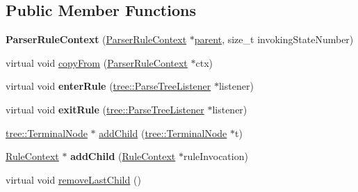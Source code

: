 \subsection*{Public Member Functions}
\begin{DoxyCompactItemize}
\item 
\mbox{\label{classantlr4_1_1ParserRuleContext_a13e9a86b7d2ccb34c2d50550deb4b36d}} 
{\bfseries Parser\+Rule\+Context} (\hyperlink{classantlr4_1_1ParserRuleContext}{Parser\+Rule\+Context} $\ast$\hyperlink{classantlr4_1_1tree_1_1ParseTree_a83402632670316b68280c04e6be70d50}{parent}, size\+\_\+t invoking\+State\+Number)
\item 
virtual void \hyperlink{classantlr4_1_1ParserRuleContext_a32e160f0c98a6475424ffe193040cdae}{copy\+From} (\hyperlink{classantlr4_1_1ParserRuleContext}{Parser\+Rule\+Context} $\ast$ctx)
\item 
\mbox{\label{classantlr4_1_1ParserRuleContext_aee63c438f6be836d5592cf1f045c735f}} 
virtual void {\bfseries enter\+Rule} (\hyperlink{classantlr4_1_1tree_1_1ParseTreeListener}{tree\+::\+Parse\+Tree\+Listener} $\ast$listener)
\item 
\mbox{\label{classantlr4_1_1ParserRuleContext_acd661fddddc4e72900091d23f6c81afe}} 
virtual void {\bfseries exit\+Rule} (\hyperlink{classantlr4_1_1tree_1_1ParseTreeListener}{tree\+::\+Parse\+Tree\+Listener} $\ast$listener)
\item 
\hyperlink{classantlr4_1_1tree_1_1TerminalNode}{tree\+::\+Terminal\+Node} $\ast$ \hyperlink{classantlr4_1_1ParserRuleContext_a402addbef275358076e63253db77b0c4}{add\+Child} (\hyperlink{classantlr4_1_1tree_1_1TerminalNode}{tree\+::\+Terminal\+Node} $\ast$t)
\item 
\mbox{\label{classantlr4_1_1ParserRuleContext_ab31addd41aee593b86d5e15c243c084e}} 
\hyperlink{classantlr4_1_1RuleContext}{Rule\+Context} $\ast$ {\bfseries add\+Child} (\hyperlink{classantlr4_1_1RuleContext}{Rule\+Context} $\ast$rule\+Invocation)
\item 
virtual void \hyperlink{classantlr4_1_1ParserRuleContext_a0d7e71fc8e12b036014820a1d530b8bb}{remove\+Last\+Child} ()
\item 
\mbox{\label{classantlr4_1_1ParserRuleContext_a7c7888fb2f93de0a8d68101192a1eb51}} 

\end{DoxyCompactItemize}

